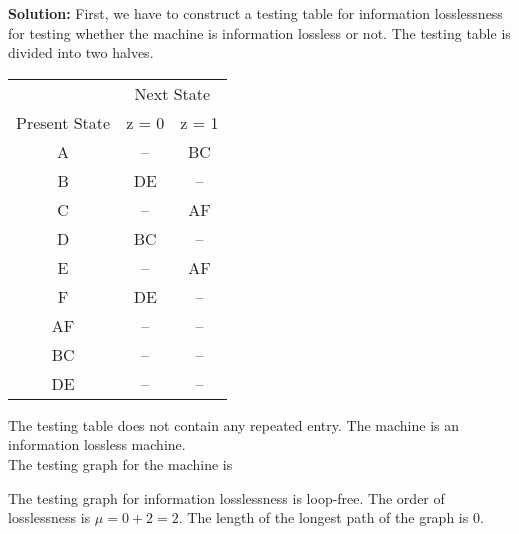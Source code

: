 \documentclass[a4,9pt]{beamer}
\begin{document}
\begin{frame}
\large{\textbf{Solution:}} First, we have to construct a testing table for information losslessness for testing whether the machine is information lossless or not. The testing table is divided into two halves.

\pause
\begin{center}
  \begin{tabular}{ccc}
\hline

\hline

\hline

\hline
 & \multicolumn{2}{c}{Next State}\\
 \cline{2-3}
Present State & z = 0 & z = 1\\
\hline
 A &     --    &     BC     \\
 B &     DE    &     --     \\
 C &     --    &     AF     \\
 D &     BC    &     --     \\
 E &     --    &     AF     \\
 F &     DE    &     --     \\
\hline
 AF &    --      &     --  \\
 BC &    --      &     --  \\
 DE &    --      &     --  \\
\hline

\hline

\hline

\hline

  \end{tabular}
\end{center}
\end{frame}

\begin{frame}

\hspace*{0.1cm} The testing table does not contain any repeated entry. The machine is an information lossless machine.\\
\hspace*{0.1cm} The testing graph for the machine is

\begin{center}
\end{center}

\pause
\hspace*{0.1cm} The testing graph for information losslessness is loop-free. The order of losslessness is $\mu = 0 + 2 = 2$. The length of the longest path of the graph is 0.
\end{frame}
\end{document}

